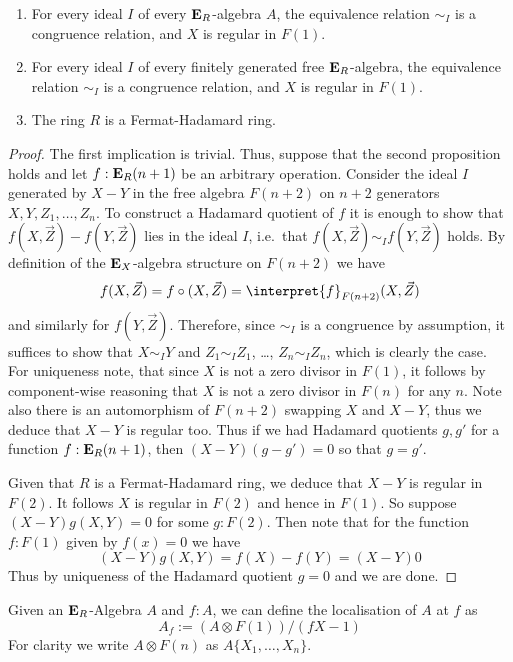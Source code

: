 {\begin{proposition}
  \begin{enumerate}
    \item
      For every ideal \(I\) of every \(\mathbf{E}_R\)-algebra \(A\), the equivalence relation \(\sim_I\) is a congruence relation, and $X$ is regular in $F(1)$.
      \item
      For every ideal \(I\) of every finitely generated free \(\mathbf{E}_R\)-algebra, the equivalence relation \(\sim_I\) is a congruence relation, and $X$ is regular in $F(1)$.
    \item
      The ring \(R\) is a Fermat-Hadamard ring.
  \end{enumerate}
\end{proposition}
\begin{proof}
  The first implication is trivial.
  Thus, suppose that the second proposition holds and let \(f:\mathbf{E}_R(n+1)\) be an arbitrary operation.
  Consider the ideal \(I\) generated by \(X-Y\) in the free algebra \(F(n+2)\) on \(n+2\) generators \(X,Y,Z_1,\dots,Z_n\).
  To construct a Hadamard quotient of \(f\) it is enough to show that \(f(X,\vec Z)-f(Y,\vec Z)\) lies in the ideal \(I\), i.e.~that \(f(X,\vec Z)\sim_I f(Y,\vec Z)\) holds.
  By definition of the \(\mathbf{E}_X\)-algebra structure on \(F(n+2)\) we have
  \[
    f(X,\vec Z) = f \circ (X,\vec Z) = \interpret{f}_{F(n+2)}(X,\vec Z)
  \]
  and similarly for \(f(Y,\vec Z)\).
  Therefore, since \(\sim_I\) is a congruence by assumption, it suffices to show that \(X\sim_I Y\) and \(Z_1 \sim_I Z_1\), \dots, \(Z_n\sim_I Z_n\), which is clearly the case.
  For uniqueness note, that since $X$ is not a zero divisor in $F(1)$, it follows by component-wise reasoning that $X$ is not a zero divisor in $F(n)$ for any $n$.
  Note also there is an automorphism of $F(n+2)$ swapping $X$ and $X-Y$, thus we deduce that $X-Y$ is regular too.
  Thus if we had Hadamard quotients $g, g'$ for a function $f : \mathbf{E}_R(n+1)$, then $(X-Y)(g - g') = 0$ so that $g = g'$.

  Given that $R$ is a Fermat-Hadamard ring, we deduce that $X-Y$ is regular in $F(2)$. 
  It follows $X$ is regular in $F(2)$ and hence in $F(1)$.
  So suppose $(X-Y)g(X,Y) = 0$ for some $g : F(2)$.
  Then note that for the function $f : F(1)$ given by $f(x) = 0$ we have
  \[ (X-Y)g(X,Y) = f(X) - f(Y) = (X - Y)0 \]
  Thus by uniqueness of the Hadamard quotient $g = 0$ and we are done.
\end{proof}

\begin{definition}
  Given an \(\mathbf{E}_R\)-Algebra \(A\) and \(f:A\), we can define the localisation of \(A\) at \(f\) as
  \[ A_f := (A \otimes F(1)) / (fX - 1)\]
  For clarity we write \(A \otimes F(n)\) as \(A\{X_1, \ldots, X_n\}\).
\end{definition}
}
